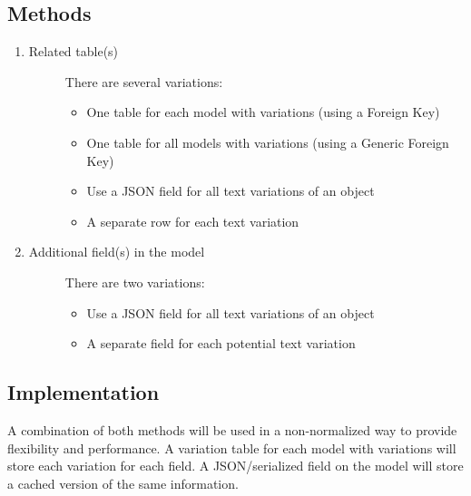 \documentclass[letterpaper,10pt,english]{sphinxmanual}
\begin{document}
\subsection{Methods}
\label{reference/implementation_notes:methods}\begin{enumerate}
\item {} \begin{description}
\item[{Related table(s)}] \leavevmode
There are several variations:
\begin{itemize}
\item {} 
One table for each model with variations (using a Foreign Key)

\item {} 
One table for all models with variations (using a Generic Foreign Key)

\item {} 
Use a JSON field for all text variations of an object

\item {} 
A separate row for each text variation

\end{itemize}

\end{description}

\item {} \begin{description}
\item[{Additional field(s) in the model}] \leavevmode
There are two variations:
\begin{itemize}
\item {} 
Use a JSON field for all text variations of an object

\item {} 
A separate field for each potential text variation

\end{itemize}

\end{description}

\end{enumerate}


\subsection{Implementation}
\label{reference/implementation_notes:implementation}
A combination of both methods will be used in a non-normalized way to provide flexibility and performance. A variation table for each model with variations will store each variation for each field. A JSON/serialized field on the model will store a cached version of the same information.
\end{document}
